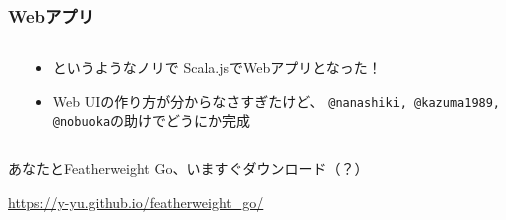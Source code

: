 \begin{frame}
  \frametitle{Webアプリ}

  \begin{columns}
    \begin{column}{0.5\textwidth}
      \pause

      \pause
    \end{column}
    \begin{column}{0.5\textwidth}
      \begin{itemize}
        \item {}というようなノリで
        Scala.jsでWebアプリとなった！
       
        \item Web UIの作り方が分からなさすぎたけど、
        \texttt{@nanashiki, @kazuma1989, @nobuoka}の助けでどうにか完成
      \end{itemize}
      
    \end{column}
  \end{columns}

  \pause
  \begin{shadequote}{}
    \begin{center}
      あなたとFeatherweight Go、いますぐダウンロード（？）

      \url{https://y-yu.github.io/featherweight_go/}
    \end{center}
  \end{shadequote}
\end{frame}

